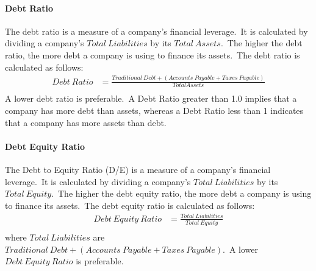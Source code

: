 \documentclass[../xlapes02]{subfiles}
\begin{document}
    \paragraph{Debt Ratio}\label{par:debt-ratio}
    The debt ratio is a measure of a company's financial leverage.\ It is calculated by dividing a company's $Total\ Liabilities$ by its $Total\ Assets$.\ The higher the debt ratio, the more debt a company is using to finance its assets.\ The debt ratio is calculated as follows:
    \begin{equation}
        \label{eq:debt-ratio}
        \begin{split}
            Debt\ Ratio&=\frac{Traditional\ Debt+(Accounts\ Payable+Taxes\ Payable)}{Total Assets}\\
        \end{split}
    \end{equation}
    A lower debt ratio is preferable.\ A Debt Ratio greater than 1.0 implies that a company has more debt than assets, whereas a Debt Ratio less than 1 indicates that a company has more assets than debt.

    \paragraph{Debt Equity Ratio}\label{par:debt-equity-ratio}
    The Debt to Equity Ratio (D/E) is a measure of a company's financial leverage.\ It is calculated by dividing a company's $Total\ Liabilities$ by its $Total\ Equity$.\ The higher the debt equity ratio, the more debt a company is using to finance its assets.\ The debt equity ratio is calculated as follows:
    \begin{equation}
        \label{eq:debt-equity-ratio}
        \begin{split}
            Debt\ Equity\ Ratio&=\frac{Total\ Liabilities}{Total\ Equity}\\
        \end{split}
    \end{equation}
    where $Total\ Liabilities$ are $Traditional\ Debt+(Accounts\ Payable+Taxes\ Payable)$.\ A lower $Debt\ Equity\ Ratio$ is preferable.
\end{document}
